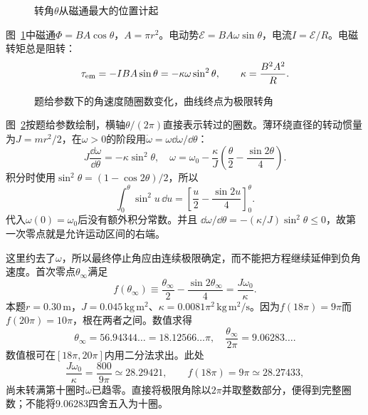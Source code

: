\begin{figure}[H]\centering
{}
\caption{转角$\theta$从磁通最大的位置计起}\label{fig:i4-e9-q}
\end{figure}
\begin{solution}
图~\ref{fig:i4-e9-q}中磁通$\Phi=BA\cos\theta$，$A=\pi r^2$。电动势$\mathcal E=BA\omega\sin\theta$，电流$I=\mathcal E/R$。电磁转矩总是阻转：
\[
\tau_{\rm em}=-IBA\sin\theta=-\kappa\omega\sin^2\theta,
\qquad \kappa=\frac{B^2A^2}{R}.
\]

\begin{figure}[H]\centering
{}
\caption{题给参数下的角速度随圈数变化，曲线终点为极限转角}\label{fig:i4-e9-s}
\end{figure}

图~\ref{fig:i4-e9-s}按题给参数绘制，横轴$\theta/(2\pi)$直接表示转过的圈数。薄环绕直径的转动惯量为$J=mr^2/2$，在$\omega>0$的阶段用$\dot\omega=\omega\dd\omega/\dd\theta$：
\[
J\frac{\dd\omega}{\dd\theta}=-\kappa\sin^2\theta,\quad
\boxed{\omega=\omega_0-\frac{\kappa}{J}
\left(\frac\theta2-\frac{\sin2\theta}{4}\right)}.
\]
积分时使用$\sin^2\theta=(1-\cos2\theta)/2$，所以
\[
\int_0^\theta\sin^2u\,\dd u
=\left[\frac u2-\frac{\sin2u}{4}\right]_0^\theta.
\]
代入$\omega(0)=\omega_0$后没有额外积分常数。并且
$\dd\omega/\dd\theta=-(\kappa/J)\sin^2\theta\leq0$，故第一次零点就是允许运动区间的右端。

这里约去了$\omega$，所以最终停止角应由连续极限确定，而不能把方程继续延伸到负角速度。首次零点$\theta_\infty$满足
\[
f(\theta_\infty)\equiv\frac{\theta_\infty}2-\frac{\sin2\theta_\infty}4
=\frac{J\omega_0}{\kappa}.
\]
本题$r=0.30\,\mathrm m$，$J=0.045\,\mathrm{kg\,m^2}$、$\kappa=0.0081\pi^2\,\mathrm{kg\,m^2/s}$。因为$f(18\pi)=9\pi$而$f(20\pi)=10\pi$，根在两者之间。数值求得
\[
\theta_\infty=56.94344\ldots=18.12566\ldots\pi,\quad
\frac{\theta_\infty}{2\pi}=9.06283\ldots .
\]
数值根可在$[18\pi,20\pi]$内用二分法求出。此处
\[
\frac{J\omega_0}{\kappa}=\frac{800}{9\pi}\simeq28.29421,\qquad
f(18\pi)=9\pi\simeq28.27433,
\]
尚未转满第十圈时$\omega$已趋零。直接将极限角除以$2\pi$并取整数部分，便得到完整圈数；不能将$9.06283$四舍五入为十圈。


\end{solution}
